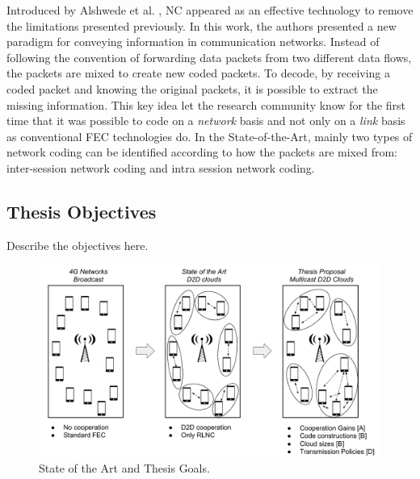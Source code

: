 Introduced by Alshwede et al. \cite{ahlswede2000network}, \ac{NC} appeared as an effective technology to remove the limitations presented previously. In this work, the authors presented a new paradigm for conveying information in communication networks. Instead of following the convention of forwarding data packets from two different data flows, the packets are mixed to create new coded packets. To decode, by receiving a coded packet and knowing the original packets, it is possible to extract the missing information. This key idea let the research community know for the first time that it was possible to code on a \textit{network} basis and not only on a \textit{link} basis as conventional \ac{FEC} technologies do. In the State-of-the-Art, mainly two types of network coding can be identified according to how the packets are mixed from: inter-session network coding and intra session network coding. 

\subsection{Thesis Objectives}
Describe the objectives here.

\begin{figure}
  \centering 
  \includegraphics[width=\textwidth]{introduction/figures/thesis-diagrams.pdf}
  \caption{State of the Art and Thesis Goals.}
\label{fig:cooperation}
\end{figure} 
